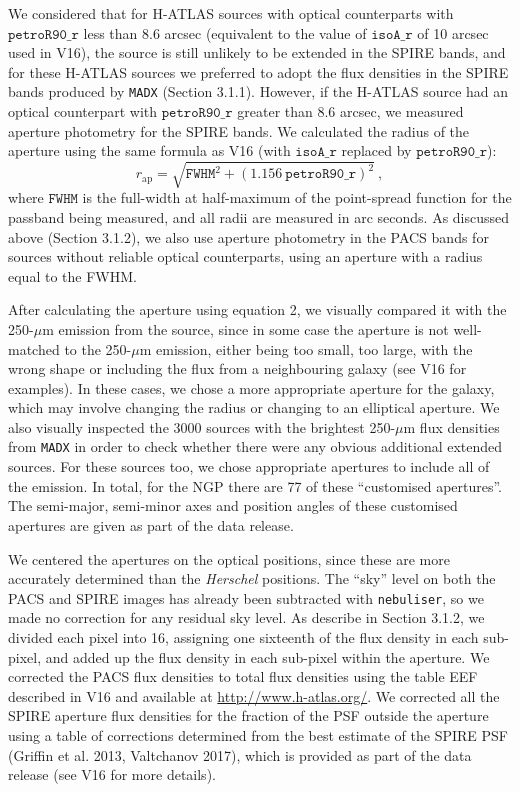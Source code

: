 \documentclass[a4paper,fleqn,usenatbib, twocolumn]{aastex61}
\begin{document}
We considered that for H-ATLAS sources with optical counterparts with
$\mathtt{petroR90\_r}$ less than 8.6 arcsec (equivalent to the value
of $\mathtt{isoA\_r}$ of 10 arcsec used in V16), the source is still
unlikely to be extended in the SPIRE bands, and for these H-ATLAS
sources we preferred to adopt the flux densities in the SPIRE bands produced by
{\tt MADX} (Section 3.1.1).  However, if the H-ATLAS source had an
optical counterpart with $\mathtt{petroR90\_r}$ greater than 8.6
arcsec, we measured aperture photometry for the SPIRE bands. We
calculated the radius of the aperture using the same formula as V16
(with $\mathtt{isoA\_r}$ replaced by $\mathtt{petroR90\_r}$):
\smallskip
\begin{equation} 
r_\mathrm{ap} = \sqrt{ \mathtt{FWHM}^2 + {(1.156
    \ \mathtt{petroR90\_r})}^2}\ , 
\end{equation}
where $\mathtt{FWHM}$ is the full-width at half-maximum of the
point-spread function for the passband being measured, and all radii
are measured in arc seconds. As discussed
above (Section 3.1.2), we also use aperture photometry in the PACS
bands for sources without reliable optical counterparts, using an
aperture with a radius equal to the FWHM.

After calculating the aperture using equation 2, we visually compared
it with the 250-$\mu$m emission from the source, since in some case
the aperture is not well-matched to the 250-$\mu$m emission, either
being too small, too large, with the wrong shape or including the flux
from a neighbouring galaxy (see V16 for examples).  In these cases, we
chose a more appropriate aperture for the galaxy, which may involve
changing the radius or changing to an elliptical aperture.  We also
visually inspected the 3000 sources with the brightest 250-$\mu$m flux
densities from {\tt MADX} in order to check whether there were any
obvious additional extended sources.  For these sources too, we chose
appropriate apertures to include all of the emission.  In total, for
the NGP there are 77 of these ``customised apertures''.  The
semi-major, semi-minor axes and position angles of these customised
apertures are given as part of the data release.

We centered the apertures on the optical positions, since these are
more accurately determined than the {\it Herschel} positions.  The
``sky'' level on both the PACS and SPIRE images has already been
subtracted with {\tt nebuliser}, so we made no correction for any
residual sky level.  As describe in Section 3.1.2, we divided each
pixel into 16, assigning one sixteenth of the flux density in each
sub-pixel, and added up the flux density in each sub-pixel within the
aperture.  We corrected the PACS flux densities to total flux
densities using the table EEF described in V16 and available at
\url{http://www.h-atlas.org/}.  We corrected all the SPIRE aperture
flux densities for the fraction of the PSF outside the aperture using
a table of corrections determined from the best estimate of the SPIRE
PSF (Griffin et al. 2013, Valtchanov 2017), which is provided as part
of the data release (see V16 for more details).
\end{document}
